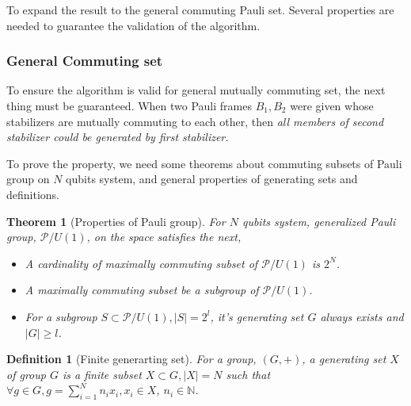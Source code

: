 \documentclass[a4paper,12pt]{article}
\newtheorem{theorem}{Theorem}
\newtheorem{definition}{Definition}
\begin{document}
To expand the result to the general commuting Pauli set.
Several properties are needed to guarantee the validation 
of the algorithm.

\subsubsection{General Commuting set}

To ensure the algorithm is valid for general mutually commuting set,
the next thing must be guaranteed.
When two Pauli frames $B_1, B_2$ were given whose stabilizers are 
mutually commuting to each other, then
\textit{all members of second stabilizer could be generated by first stabilizer.}





To prove the property, we need some theorems\cite{sarkar_sets_2021} about 
commuting subsets of Pauli group on $N$ qubits system, and general properties of generating sets and definitions\cite{zeigler_maximally_1974}.

\begin{theorem}[Properties of Pauli group]
    For $N$ qubits system, generalized Pauli group, $\mathcal{P}/U(1)$, on the space satisfies the next,

    \begin{itemize}
        \item A cardinality of maximally commuting subset of $\mathcal{P}/U(1)$ is $2^N$.
        \item A maximally commuting subset be a subgroup of $\mathcal{P}/U(1)$.
        \item For a subgroup $S \subset \mathcal{P}/U(1), |S| = 2^l$, it's generating set $G$ always exists and $|G| \geq l$.
    \end{itemize}
\end{theorem}

\begin{definition}[Finite generarting set]
    For a group, $(G, +)$, a generating set $X$ of group $G$ is a finite subset $X \subset G, |X| = N$ such that
    $\forall g \in G, g = \sum_{i=1}^N n_i x_i, x_i \in X$, $n_i \in \mathbb{N}$.
\end{definition}
\end{document}
